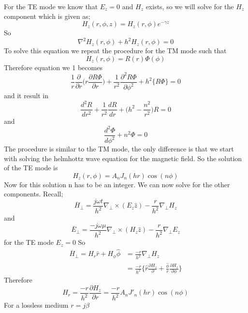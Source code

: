 For the TE mode we know that $E_z = 0$ and $H_z$ exists, so we will solve for the $H_z$   component which is given as;
$$H_z(r,\phi,z) = H_z(r,\phi)e^{-\gamma z}$$ So \begin{equation} \nabla^2 H_z(r,\phi) +  h^2 H_z(r,\phi) = 0\end{equation}
To solve this equation we repeat the procedure for the TM mode such that 
$$H_z(r,\phi)= R(r)\Phi(\phi)$$
Therefore equation we 1 becomes
$$ \frac{1}{r}\frac{\partial}{\partial r}\bigg(r\frac{\partial R\Phi}{\partial r}\bigg) + \frac{1}{r^2}\frac{\partial^2 R\Phi}{\partial \phi^2} + h^2\{R\Phi\} = 0$$
and it result in
\begin{equation}
\dfrac{d^2 R}{dr^2} + \frac{1}{r^2}\dfrac{dR}{dr} + \bigg(h^2 - \frac{n^2}{r^2}\bigg)R = 0
\end{equation}
and 
\begin{equation}
\dfrac{d^2\Phi}{d\phi^2} + n^2\Phi = 0
\end{equation}
The procedure is similar to the TM mode, the only difference is that we start with solving  the helmhottz wave equation for the magnetic field.
So the solution of the TE mode is 
$$ H_z(r,\phi) = A_nJ_n(hr)\cos(n\phi)$$
Now for this solution n has to be an integer. We can now solve for the other components. Recall;
$$ \overline{H}_\perp = \frac{j\omega t}{h^2}\nabla_\perp\times(E_z\hat{z}) - \frac{r}{h^2}\nabla_\perp H_z$$ and
$$\overline{E}_\perp = \frac{-j\omega \mu}{h^2}\nabla_\perp\times(H_z\hat{z}) - \frac{r}{h^2}\nabla_\perp E_z$$
for the TE mode $E_z = 0$ So 
\begin{align} 
\overline{H}_\perp = H_r \hat{r} + H_\phi \hat{\phi} &= \frac{-r}{h^2}\nabla_\perp H_z\\
&= \frac{-r}{h^2}\bigg\{ 
\hat{r}\frac{\partial H_z}{\partial} + \frac{\hat{\phi}}{r} \frac{\partial H_z}{\partial \phi}   
\bigg\}
\end{align}
Therefore
$$H_r = \frac{-r}{h^2}\frac{\partial H_z}{\partial r} =  \frac{-r}{h^2}A_nJ'_n(hr)\cos(n\phi)$$
For a lossless medium $ r =j\beta$

